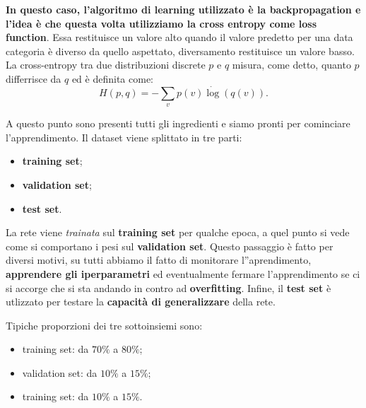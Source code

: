 \textbf{In questo caso, l'algoritmo di learning utilizzato è la backpropagation e l'idea è che questa volta utilizziamo la cross entropy come loss function}. Essa restituisce un valore alto quando il valore predetto per una data categoria è diverso da quello aspettato, diversamento restituisce un valore basso. La cross-entropy tra due distribuzioni discrete $p$ e $q$ misura, come detto, quanto $p$ differrisce da $q$ ed è definita come:
\begin{equation}
    H(p,q) = -\sum_vp(v)\dot\log{(q(v))}.
\end{equation}

A questo punto sono presenti tutti gli ingredienti e siamo pronti per cominciare l'apprendimento. Il dataset viene splittato in tre parti:
\begin{itemize}
    \item \textbf{training set};
    \item \textbf{validation set};
    \item \textbf{test set}.
\end{itemize}
La rete viene \textit{trainata} sul \textbf{training set} per qualche epoca, a quel punto si vede come si comportano i pesi sul \textbf{validation set}. Questo passaggio è fatto per diversi motivi, su tutti abbiamo il fatto di monitorare l''aprendimento, \textbf{apprendere gli iperparametri} ed eventualmente fermare l'apprendimento se ci si accorge che si sta andando in contro ad \textbf{overfitting}. Infine, il \textbf{test set} è utlizzato per testare la \textbf{capacità di generalizzare} della rete.


Tipiche proporzioni dei tre sottoinsiemi sono:
\begin{itemize}
    \item training set: da $70\%$ a $80\%$;
    \item validation set: da $10\%$ a $15\%$;
    \item training set: da $10\%$ a $15\%$.
\end{itemize}

\newpage

